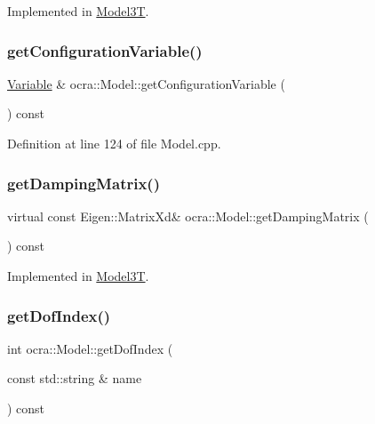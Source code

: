 Implemented in \hyperlink{classModel3T_abe65ef07b4e6c61f6567c1f007631081}{Model3T}.

\hypertarget{classocra_1_1Model_aff63dd9c26f6149f0cdc33a402eca4ea}{}\label{classocra_1_1Model_aff63dd9c26f6149f0cdc33a402eca4ea} 
\subsubsection{\texorpdfstring{get\+Configuration\+Variable()}{getConfigurationVariable()}}
{\footnotesize\ttfamily \hyperlink{classocra_1_1Variable}{Variable} \& ocra\+::\+Model\+::get\+Configuration\+Variable (\begin{DoxyParamCaption}{ }\end{DoxyParamCaption}) const}



Definition at line 124 of file Model.\+cpp.

\hypertarget{classocra_1_1Model_adfbe3160558dd221e7e91e2aad4d5089}{}\label{classocra_1_1Model_adfbe3160558dd221e7e91e2aad4d5089} 
\subsubsection{\texorpdfstring{get\+Damping\+Matrix()}{getDampingMatrix()}}
{\footnotesize\ttfamily virtual const Eigen\+::\+Matrix\+Xd\& ocra\+::\+Model\+::get\+Damping\+Matrix (\begin{DoxyParamCaption}{ }\end{DoxyParamCaption}) const\hspace{0.3cm}{\ttfamily [pure virtual]}}



Implemented in \hyperlink{classModel3T_a5ed6794462c63bdd1eeabbfa221e2ef6}{Model3T}.

\hypertarget{classocra_1_1Model_a070d9fa513218ca3f9fa8b2690563482}{}\label{classocra_1_1Model_a070d9fa513218ca3f9fa8b2690563482} 
\subsubsection{\texorpdfstring{get\+Dof\+Index()}{getDofIndex()}}
{\footnotesize\ttfamily int ocra\+::\+Model\+::get\+Dof\+Index (\begin{DoxyParamCaption}\item[{const std\+::string \&}]{name }\end{DoxyParamCaption}) const}




